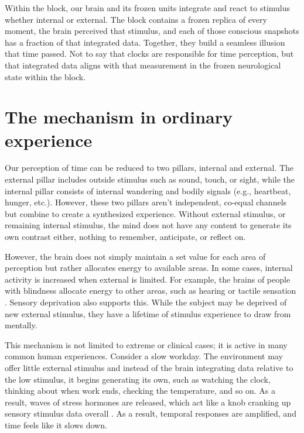 \documentclass[11pt,a4paper]{article}
\begin{document}
Within the block, our brain and its frozen units integrate and react to stimulus whether internal or external. The block contains a frozen replica of every moment, the brain perceived that stimulus, and each of those conscious snapshots has a fraction of that integrated data. Together, they build a seamless illusion that time passed. Not to say that clocks are responsible for time perception, but that integrated data aligns with that measurement in the frozen neurological state within the block.

\section{The mechanism in ordinary experience}

Our perception of time can be reduced to two pillars, internal and external. The external pillar includes outside stimulus such as sound, touch, or sight, while the internal pillar consists of internal wandering and bodily signals (e.g., heartbeat, hunger, etc.). However, these two pillars aren't independent, co-equal channels but combine to create a synthesized experience. Without external stimulus, or remaining internal stimulus, the mind does not have any content to generate its own contrast either, nothing to remember, anticipate, or reflect on.

However, the brain does not simply maintain a set value for each area of perception but rather allocates energy to available areas. In some cases, internal activity is increased when external is limited. For example, the brains of people with blindness allocate energy to other areas, such as hearing or tactile sensation \citep{khalaf2025shared}. Sensory deprivation also supports this. While the subject may be deprived of new external stimulus, they have a lifetime of stimulus experience to draw from mentally.

This mechanism is not limited to extreme or clinical cases; it is active in many common human experiences. Consider a slow workday. The environment may offer little external stimulus and instead of the brain integrating data relative to the low stimulus, it begins generating its own, such as watching the clock, thinking about when work ends, checking the temperature, and so on. As a result, waves of stress hormones are released, which act like a knob cranking up sensory stimulus data overall \citep{henckens2009}. As a result, temporal responses are amplified, and time feels like it slows down.
\end{document}
